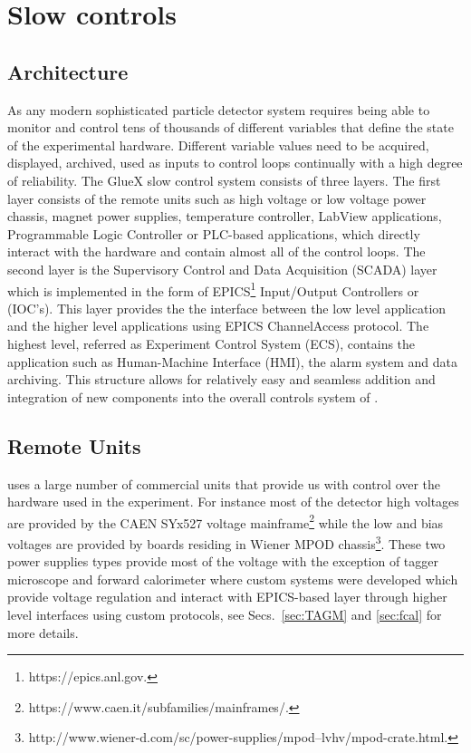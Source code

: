 
\section[Slow controls]{Slow controls \label{sec:controls}}
\subsection{Architecture \label{sec:controlsarchitechture}}
As any modern sophisticated particle detector system \gx{} requires being able to monitor 
and control tens of thousands of different variables that define the state of the experimental hardware. Different variable values need to be acquired, displayed, archived, used as inputs to control loops continually with a high degree of reliability. The GlueX slow control system consists of three layers. The first layer consists of the remote units such as high voltage or low voltage power chassis, magnet power supplies, temperature controller, LabView applications, Programmable Logic Controller or PLC-based applications, which directly interact with the hardware and contain almost all of the control loops. The second layer is the Supervisory Control and Data Acquisition (SCADA) layer which is implemented in the form of EPICS\footnote{https://epics.anl.gov.} Input/Output Controllers or (IOC's). This layer provides the the interface between the low level application and the higher level applications using EPICS ChannelAccess protocol. The highest level, referred as Experiment Control System (ECS), contains the application such as Human-Machine Interface (HMI), the alarm system and data archiving. This structure allows for relatively easy and seamless addition and integration of new components into the overall controls system of \gx{}.    

\subsection{Remote Units \label{sec:controlsinterface}}
\gx{} uses a large number of commercial units that provide us with control over the hardware used in the experiment. For instance most of the detector high voltages are provided by the CAEN SYx527 voltage mainframe\footnote{https://www.caen.it/subfamilies/mainframes/.} while the low and bias voltages are provided by boards residing in Wiener MPOD chassis\footnote{http://www.wiener-d.com/sc/power-supplies/mpod--lvhv/mpod-crate.html.}. These two power supplies types provide most of the voltage with the exception of tagger microscope and forward calorimeter where custom systems were developed which provide voltage regulation and interact with EPICS-based layer through higher level interfaces using custom protocols, see Secs.~\ref{sec:TAGM} and \ref{sec:fcal} for more details.  

